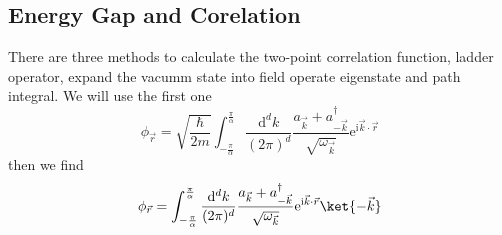 \subsection{Energy Gap and Corelation}
There are three methods to calculate the two-point correlation function, ladder operator, expand the vacumm state into field operate eigenstate and path integral.
We will use the first one
\begin{equation}
    \phi_{\vec{r}} = \sqrt{\frac{\hbar }{2m}} \int_{- \frac{\pi}{\alpha}} ^{\frac{\pi}{\alpha
    }} \frac{\mathrm{d}^{d} k}{(2\pi)^{d}}  \frac{a_{\vec{k}} + a_{-\vec{k}}^{\dagger}}{\sqrt{\omega_{\vec{k}}}} \mathrm{e}^{\mathrm{i}\vec{k} \cdot \vec{r}}
\end{equation}
then we find
\begin{equation}
    \phi_{\vec{r}} = \int_{-\frac{\pi}{\alpha}} ^{\frac{\pi}{\alpha}} \frac{\mathrm{d}^{d} k}{(2\pi)^{d}} \frac{a_{\vec{k}} + a_{-\vec{k}}^{\dagger}}{\sqrt{\omega_{\vec{k}}}} \mathrm{e}^{\mathrm{i}\vec{k} \cdot \vec{r}} \ket{-\vec{k}}
\end{equation}

